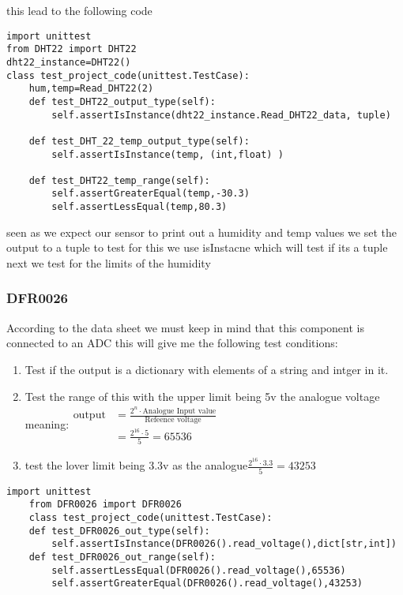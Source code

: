 this lead to the  following code 
\begin{lstlisting}[style=mystyle,caption={sample test for DHT22}]
import unittest
from DHT22 import DHT22
dht22_instance=DHT22()
class test_project_code(unittest.TestCase):
    hum,temp=Read_DHT22(2)
    def test_DHT22_output_type(self):
        self.assertIsInstance(dht22_instance.Read_DHT22_data, tuple)

    def test_DHT_22_temp_output_type(self):
        self.assertIsInstance(temp, (int,float) )

    def test_DHT22_temp_range(self):
        self.assertGreaterEqual(temp,-30.3)
        self.assertLessEqual(temp,80.3)
\end{lstlisting}
seen as we expect our sensor to  print out a humidity and temp values we  set the  output to  a tuple 
to test for this we use isInstacne which will test if its a tuple
next we test for the  limits of the  humidity
\subsubsection{DFR0026}
According to the  data sheet \cite{ada} we must keep in mind  that this  component is  connected to  an ADC 
this  will  give  me  the  following  test conditions:
\begin{enumerate}
    \item Test if  the output is a dictionary with elements of a string and intger in it.

    \item Test  the  range of this  with the  upper limit being 5v the analogue voltage meaning:$\begin{aligned}\text{output}&= \frac{2^n\cdot \text{Analogue Input value}}{\text{Refeence voltage}}\\ &=\frac{2^{16}\cdot 5}{5}=65536\end{aligned}$
    \item test the  lover limit being 3.3v as the analogue$\frac{2^{16}\cdot 3.3}{5}=43253$
\end{enumerate}
\begin{lstlisting}[style=mystyle,caption={unit test for  DFR0026 and  MCP3008}]
    import unittest
    from DFR0026 import DFR0026
    class test_project_code(unittest.TestCase):
    def test_DFR0026_out_type(self):
        self.assertIsInstance(DFR0026().read_voltage(),dict[str,int])
    def test_DFR0026_out_range(self):
        self.assertLessEqual(DFR0026().read_voltage(),65536)
        self.assertGreaterEqual(DFR0026().read_voltage(),43253)
\end{lstlisting}
